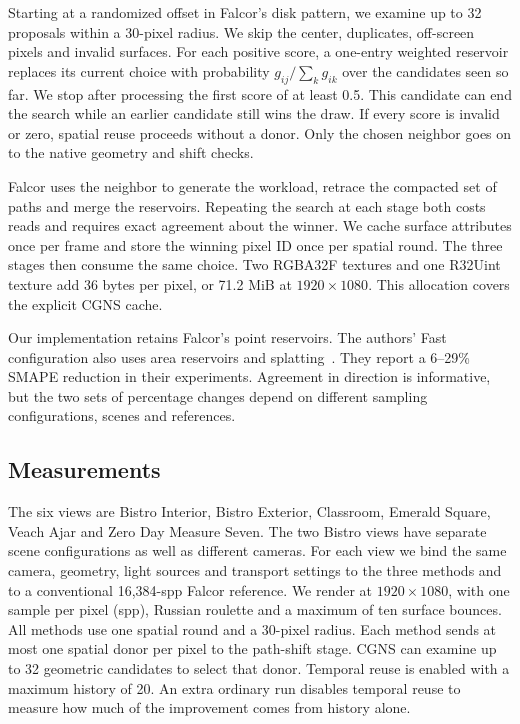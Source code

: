 \documentclass[a4paper,twocolumn]{article}
\begin{document}
Starting at a randomized offset in Falcor's disk pattern, we examine up to 32 proposals within a 30-pixel radius. We skip the center, duplicates, off-screen pixels and invalid surfaces. For each positive score, a one-entry weighted reservoir replaces its current choice with probability $g_{ij}/\sum_k g_{ik}$ over the candidates seen so far. We stop after processing the first score of at least 0.5. This candidate can end the search while an earlier candidate still wins the draw. If every score is invalid or zero, spatial reuse proceeds without a donor. Only the chosen neighbor goes on to the native geometry and shift checks.

Falcor uses the neighbor to generate the workload, retrace the compacted set of paths and merge the reservoirs. Repeating the search at each stage both costs reads and requires exact agreement about the winner. We cache surface attributes once per frame and store the winning pixel ID once per spatial round. The three stages then consume the same choice. Two RGBA32F textures and one R32Uint texture add 36 bytes per pixel, or 71.2 MiB at $1920\times1080$. This allocation covers the explicit CGNS cache.

Our implementation retains Falcor's point reservoirs. The authors' Fast configuration also uses area reservoirs and splatting~\cite{junkins}. They report a 6--29\% SMAPE reduction in their experiments. Agreement in direction is informative, but the two sets of percentage changes depend on different sampling configurations, scenes and references.

\subsection{Measurements}
The six views are Bistro Interior, Bistro Exterior, Classroom, Emerald Square, Veach Ajar and Zero Day Measure Seven. The two Bistro views have separate scene configurations as well as different cameras. For each view we bind the same camera, geometry, light sources and transport settings to the three methods and to a conventional 16,384-spp Falcor reference. We render at $1920\times1080$, with one sample per pixel (spp), Russian roulette and a maximum of ten surface bounces. All methods use one spatial round and a 30-pixel radius. Each method sends at most one spatial donor per pixel to the path-shift stage. CGNS can examine up to 32 geometric candidates to select that donor. Temporal reuse is enabled with a maximum history of 20. An extra ordinary run disables temporal reuse to measure how much of the improvement comes from history alone.
\end{document}
